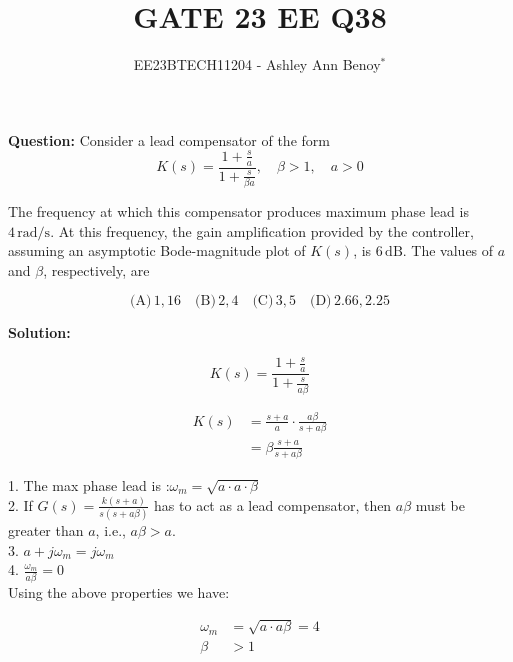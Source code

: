 \documentclass[journal,12pt,twocolumn]{IEEEtran}
\theoremstyle{remark}
\begin{document}
    
    \vspace{3cm}
    
    \title{GATE 23 EE Q38}
    \author{EE23BTECH11204 - Ashley Ann Benoy$^{*}$}%
    \maketitle
    \newpage
    \bigskip
    
    
    
    \textbf{Question: }
    Consider a lead compensator of the form
    \[ K(s) = \frac{1 + \frac{s}{a}}{1 + \frac{s}{\beta a}}, \quad \beta > 1, \quad a > 0 \]
    
    The frequency at which this compensator produces maximum phase lead is \(4 \, \text{rad/s}\). At this frequency, the gain amplification provided by the controller, assuming an asymptotic Bode-magnitude plot of \(K(s)\), is \(6 \, \text{dB}\). The values of \(a\) and \(\beta\), respectively, are
    
    \[
    \text{(A)} \, 1, 16 \quad
    \text{(B)} \, 2, 4 \quad
    \text{(C)} \, 3, 5 \quad
    \text{(D)} \, 2.66, 2.25
    \]
    
    \textbf{Solution:}
    
   
    
    \[ K(s) = \frac{1 + \frac{s}{a}}{1 + \frac{s}{a\beta}} \]
    
    \begin{align}
    K(s) &= \frac{s + a}{a} \cdot \frac{a\beta}{s + a\beta} \\
    &= \beta \frac{s + a}{s + a\beta}
    \end{align}
    
    1. The max phase lead is :\(\omega_m = \sqrt{a \cdot a \cdot \beta}\)\\

    2. If \(G(s) = \frac{k(s+a)}{s(s+a\beta)}\) has to act as a lead compensator, then \(a\beta\) must be greater than \(a\), i.e., \(a\beta > a \).\\
    
    3. \(a+j\omega_m=j\omega_m\)\\
     
    4. \(\frac{\omega_m}{a\beta}=0\)\\
    
    Using the above properties we have:
    
    \begin{align}
    \omega_m &= \sqrt{ a \cdot a \beta}=4 \\
    \beta &> 1
    \end{align}
    
\end{document}

